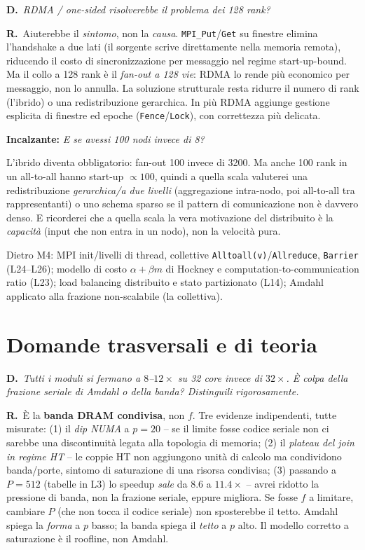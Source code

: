 \documentclass[11pt,a4paper]{article}
\newcommand{\D}[1]{\begin{dom}\small\textbf{D.}\ \itshape #1\end{dom}}
\newcommand{\R}{\noindent\textbf{R.}\ }
\newcommand{\Inc}[1]{\par\smallskip\noindent\textbf{\textcolor{red!55!black}{Incalzante:}} \textit{#1}\ \par}
\begin{document}
\D{RDMA / one-sided risolverebbe il problema dei 128 rank?}
\R Aiuterebbe il \emph{sintomo}, non la \emph{causa}. \texttt{MPI\_Put}/\texttt{Get} su finestre elimina l'handshake a due lati (il sorgente scrive direttamente nella memoria remota), riducendo il costo di sincronizzazione per messaggio nel regime start-up-bound. Ma il collo a 128 rank è il \emph{fan-out a 128 vie}: RDMA lo rende più economico per messaggio, non lo annulla. La soluzione strutturale resta ridurre il numero di rank (l'ibrido) o una redistribuzione gerarchica. In più RDMA aggiunge gestione esplicita di finestre ed epoche (\texttt{Fence}/\texttt{Lock}), con correttezza più delicata.
\Inc{E se avessi 100 nodi invece di 8?} L'ibrido diventa obbligatorio: fan-out 100 invece di 3200. Ma anche 100 rank in un all-to-all hanno start-up $\propto 100$, quindi a quella scala valuterei una redistribuzione \emph{gerarchica/a due livelli} (aggregazione intra-nodo, poi all-to-all tra rappresentanti) o uno schema sparso se il pattern di comunicazione non è davvero denso. E ricorderei che a quella scala la vera motivazione del distribuito è la \emph{capacità} (input che non entra in un nodo), non la velocità pura.

\begin{theorybox}
Dietro M4: MPI init/livelli di thread, collettive \texttt{Alltoall(v)}/\texttt{Allreduce}, \texttt{Barrier} (L24--L26); modello di costo $\alpha+\beta m$ di Hockney e computation-to-communication ratio (L23); load balancing distribuito e stato partizionato (L14); Amdahl applicato alla frazione non-scalabile (la collettiva).
\end{theorybox}
\section{Domande trasversali e di teoria}

\D{Tutti i moduli si fermano a $8$--$12\times$ su 32 core invece di $32\times$. È colpa della frazione seriale di Amdahl o della banda? Distinguili rigorosamente.}
\R È la \textbf{banda DRAM condivisa}, non $f$. Tre evidenze indipendenti, tutte misurate: (1) il \emph{dip NUMA} a $p=20$ -- se il limite fosse codice seriale non ci sarebbe una discontinuità legata alla topologia di memoria; (2) il \emph{plateau del join in regime HT} -- le coppie HT non aggiungono unità di calcolo ma condividono banda/porte, sintomo di saturazione di una risorsa condivisa; (3) passando a $P=512$ (tabelle in L3) lo speedup \emph{sale} da $8.6$ a $11.4\times$ -- avrei ridotto la pressione di banda, non la frazione seriale, eppure migliora. Se fosse $f$ a limitare, cambiare $P$ (che non tocca il codice seriale) non sposterebbe il tetto. Amdahl spiega la \emph{forma} a $p$ basso; la banda spiega il \emph{tetto} a $p$ alto. Il modello corretto a saturazione è il roofline, non Amdahl.
\end{document}
